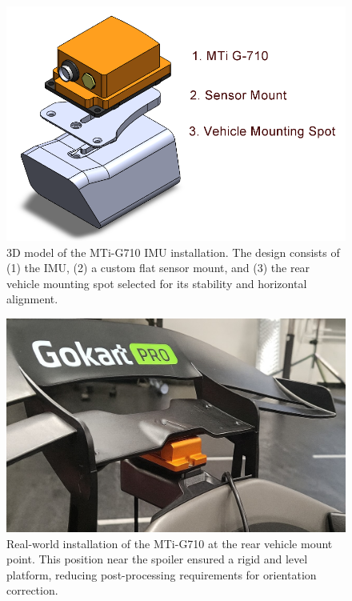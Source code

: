 \begin{figure}[!htbp]
    \centering
    \includegraphics[width=0.65\linewidth]{images/MTi3DModel.png}
    \caption{3D model of the MTi-G710 IMU installation. 
    The design consists of (1) the IMU, (2) a custom flat sensor mount, and (3) the rear vehicle mounting spot selected for its stability and horizontal alignment.}
    \label{fig:MTi3DModel}
\end{figure}

\begin{figure}[!htbp]
    \centering
    \includegraphics[width=0.65\linewidth]{images/MTiVehicleMount.png}
    \caption{Real-world installation of the MTi-G710 at the rear vehicle mount point. 
    This position near the spoiler ensured a rigid and level platform, reducing post-processing requirements for orientation correction.}
    \label{fig:MTiRealMount}
\end{figure}
